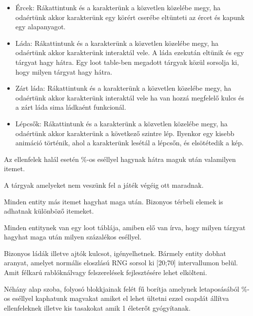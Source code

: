 \begin{itemize}

\item
Ércek: Rákattintunk és a karakterünk a közvetlen közelébe megy, ha odaértünk akkor karakterünk egy körért cserébe eltünteti az ércet és kapunk egy alapanyagot.
\item
Láda: Rákattintunk és a karakterünk a közvetlen közelébe megy, ha odaértünk akkor karakterünk interaktál vele. A láda ezekután eltünik és egy tárgyat hagy hátra. Egy loot table-ben megadott tárgyak közül sorsolja ki, hogy milyen tárgyat hagy hátra.


\item
Zárt láda: Rákattintunk és a karakterünk a közvetlen közelébe megy, ha odaértünk akkor karakterünk interaktál vele ha van hozzá megfelelő kulcs és a zárt láda sima ládkaént funkcionál.
\item
Lépcsők: Rákattintunk és a karakterünk a közvetlen közelébe megy, ha odaértünk akkor karakterünk a következő szintre lép. Ilyenkor egy kisebb animáció történik, ahol a karakterünk lesétál a lépcsőn, és elsötétedik a kép.

\end{itemize}
\newpage
{}

Az ellenfelek halál esetén \%-os eséllyel hagynak hátra maguk után valamilyen itemet.

A tárgyak amelyeket nem veszünk fel a játék végéig ott maradnak.

Minden entity más itemet hagyhat maga után.
Bizonyos térbeli elemek is adhatnak különböző itemeket.

Minden entitynek van egy loot táblája, amiben elő van írva, hogy milyen tárgyat hagyhat maga után milyen százalékos eséllyel.


Bizonyos ládák illetve ajtók kulcsot, igényelhetnek.
Bármely entity dobhat aranyat, amelyet normális eloszlású RNG sorsol ki [20;70] intervallumon belül. Amit félkarú rablóknálvagy felszerelések fejlesztésére lehet elkölteni.


Néhány alap szoba, folyosó blokkjainak felét fű borítja amelynek letaposásából \%-os eséllyel kaphatunk magvakat amiket el lehet ültetni ezzel csapdát állítva ellenfeleknek illetve kis tasakokat amik 1 életerőt gyógyítanak.

